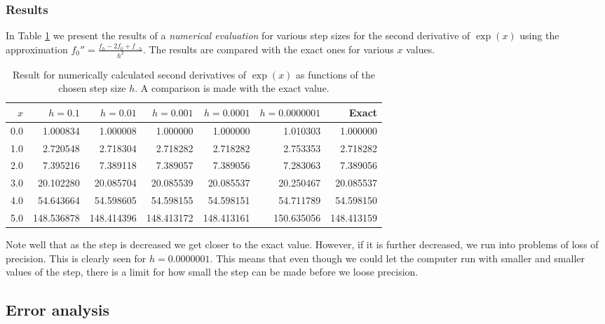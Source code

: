 \subsubsection{Results}
In Table \ref{tab:secderivchap3} we present the results 
of a {\em numerical evaluation }
for various step sizes for the second
derivative  of $\exp{(x)}$ using the approximation  
$f_0''=\frac{ f_h -2f_0 +f_{-h}}{h^2}$. The results are 
compared with the exact ones for various $x$ values.
\begin{table}[hbtp]
\begin{center}
\begin{tabular}{rrrrrrr}\hline
$x$&$h=0.1$&$h=0.01$&$h=0.001$&$h=0.0001$&$h=0.0000001$ &Exact\\\hline
  0.0&  1.000834 &   1.000008 &   1.000000 &   1.000000 &   1.010303 &   1.000000  \\ 
 1.0&    2.720548 &   2.718304  &  2.718282  &  2.718282  &  2.753353  &  2.718282  \\
 2.0&   7.395216  &  7.389118  &  7.389057  &  7.389056  &  7.283063  &  7.389056  \\
 3.0&    20.102280 &  20.085704 &  20.085539 &  20.085537 &  20.250467 &  20.085537   \\
 4.0&   54.643664 &  54.598605 &  54.598155  & 54.598151 &  54.711789  & 54.598150  \\
 5.0&   148.536878 & 148.414396 & 148.413172 & 148.413161 & 150.635056 & 148.413159 \\\hline
\end{tabular} 
\caption{Result  for numerically calculated second derivatives of $\exp{(x)}$ as functions of the 
chosen step size $h$.  A comparison is made
         with the exact value. \label{tab:secderivchap3}}
\end{center}   
\end{table}     
Note well that as the step is decreased we get closer to the exact value. However,
if it is further decreased, we run into problems of loss of precision. This is clearly seen
for $h=0.0000001$.
This means that even though we could let the computer run with smaller and smaller
values of the step, there is a limit for how small the step can be made before we
loose precision.  

\subsection{Error analysis}

